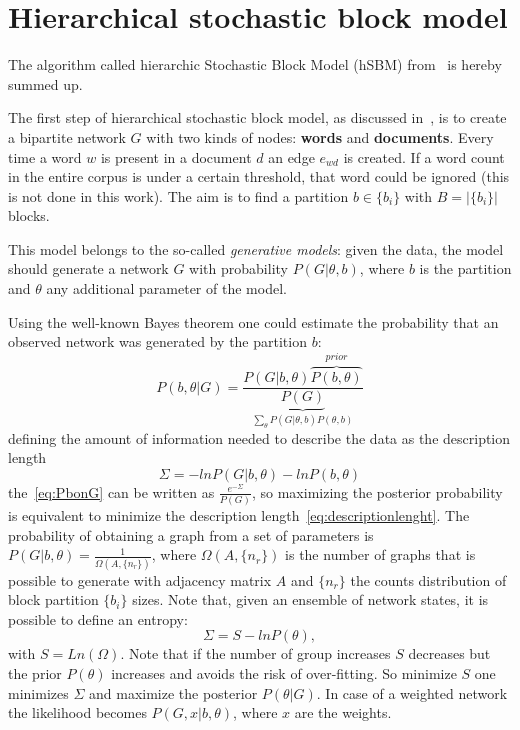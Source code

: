 \appendix
\chapter{Hierarchical stochastic block model}\label{app:hsbm}
The algorithm called hierarchic Stochastic Block Model (hSBM) from~\cite{gerlach2018network} is hereby summed up.

The first step of hierarchical stochastic block model, as discussed in~\cite{peixoto2014efficient}, is to create a bipartite network $G$ with two kinds of nodes: \textbf{words} and \textbf{documents}. Every time a word $w$ is present in a document $d$ an edge $e_{wd}$ is created. If a word count in the entire corpus is under a certain threshold, that word could be ignored (this is not done in this work). The aim is to find a partition $b\in\{b_i\}$ with $B=\left|\{b_i\}\right|$ blocks.

This model belongs to the so-called \textit{generative models}: given the data, the model should generate a network $G$ with probability $P(G|\theta, b)$, where $b$ is the partition and $\theta$ any additional parameter of the model.

Using the well-known Bayes theorem one could estimate the probability that an observed network was generated by the partition $b$:
\begin{equation}\label{eq:PbonG}
  P(b,\theta|G)=\frac{P(G|b,\theta)\overbrace{P(b,\theta)}^{prior}}{\underbrace{P(G)}_{\sum_{\theta}P(G|\theta, b)P(\theta, b)}}
\end{equation}
defining the amount of information needed to describe the data as the description length
\begin{equation}\label{eq:descriptionlenght}
  \Sigma=-lnP(G|b,\theta)-lnP(b, \theta)
\end{equation}
the~\ref{eq:PbonG} can be written as $\frac{e^{-\Sigma}}{P(G)}$, so maximizing the posterior probability is equivalent to minimize the description length~\ref{eq:descriptionlenght}. The probability of obtaining a graph from a set of parameters is $P(G|b,\theta)=\frac{1}{\Omega(A,\{n_r\})}$, where $\Omega(A,\{n_r\})$ is the number of graphs that is possible to generate with adjacency matrix $A$ and $\{n_r\}$ the counts distribution of block partition $\{b_i\}$ sizes.
Note that, given an ensemble of network states, it is possible to define an entropy:
\[
\Sigma=S-lnP(\theta),
\]
with $S=Ln\left(\Omega\right)$. Note that if the number of group increases $S$ decreases but the prior $P(\theta)$ increases and avoids the risk of over-fitting.
So minimize $S$ one minimizes $\Sigma$ and maximize the posterior $P(\theta|G)$.
In case of a weighted network the likelihood becomes $P(G,x|b,\theta)$, where $x$ are the weights.

